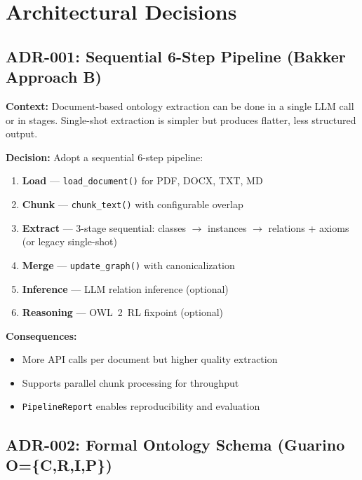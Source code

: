 \documentclass[11pt,a4paper]{article}
\begin{document}
\section{Architectural Decisions}

\subsection{ADR-001: Sequential 6-Step Pipeline (Bakker Approach B)}
\label{sec:adr-pipeline}

\textbf{Context:} Document-based ontology extraction can be done in a single LLM call or in stages. Single-shot extraction is simpler but produces flatter, less structured output.

\textbf{Decision:} Adopt a sequential 6-step pipeline:
\begin{enumerate}
    \item \textbf{Load} --- \texttt{load\_document()} for PDF, DOCX, TXT, MD
    \item \textbf{Chunk} --- \texttt{chunk\_text()} with configurable overlap
    \item \textbf{Extract} --- 3-stage sequential: classes $\rightarrow$ instances $\rightarrow$ relations + axioms (or legacy single-shot)
    \item \textbf{Merge} --- \texttt{update\_graph()} with canonicalization
    \item \textbf{Inference} --- LLM relation inference (optional)
    \item \textbf{Reasoning} --- OWL~2~RL fixpoint (optional)
\end{enumerate}

\textbf{Consequences:}
\begin{itemize}
    \item More API calls per document but higher quality extraction
    \item Supports parallel chunk processing for throughput
    \item \texttt{PipelineReport} enables reproducibility and evaluation
\end{itemize}

\subsection{ADR-002: Formal Ontology Schema (Guarino O=\{C,R,I,P\})}
\label{sec:adr-schema}
\end{document}
